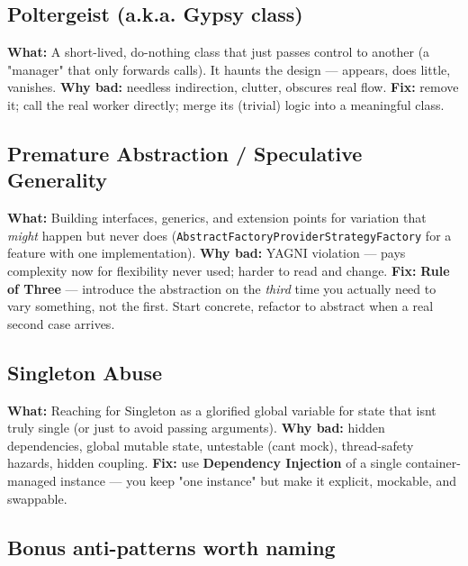 \documentclass[11pt]{article}
\begin{document}
\subsection{Poltergeist (a.k.a. Gypsy class)}\label{poltergeist-aka-gypsy-class}

\textbf{What:} A short-lived, do-nothing class that just passes control to another (a "manager" that only forwards calls). It haunts the design --- appears, does little, vanishes. \textbf{Why bad:} needless indirection, clutter, obscures real flow. \textbf{Fix:} remove it; call the real worker directly; merge its (trivial) logic into a meaningful class.

\subsection{Premature Abstraction / Speculative Generality}\label{premature-abstraction--speculative-generality}

\textbf{What:} Building interfaces, generics, and extension points for variation that \emph{might} happen but never does (\texttt{AbstractFactoryProviderStrategyFactory} for a feature with one implementation). \textbf{Why bad:} YAGNI violation --- pays complexity now for flexibility never used; harder to read and change. \textbf{Fix:} \textbf{Rule of Three} --- introduce the abstraction on the \emph{third} time you actually need to vary something, not the first. Start concrete, refactor to abstract when a real second case arrives.

\subsection{Singleton Abuse}\label{singleton-abuse}

\textbf{What:} Reaching for Singleton as a glorified global variable for state that isn\textquotesingle t truly single (or just to avoid passing arguments). \textbf{Why bad:} hidden dependencies, global mutable state, untestable (can\textquotesingle t mock), thread-safety hazards, hidden coupling. \textbf{Fix:} use \textbf{Dependency Injection} of a single container-managed instance --- you keep "one instance" but make it explicit, mockable, and swappable.

\subsection{Bonus anti-patterns worth naming}\label{bonus-anti-patterns-worth-naming}
\end{document}
